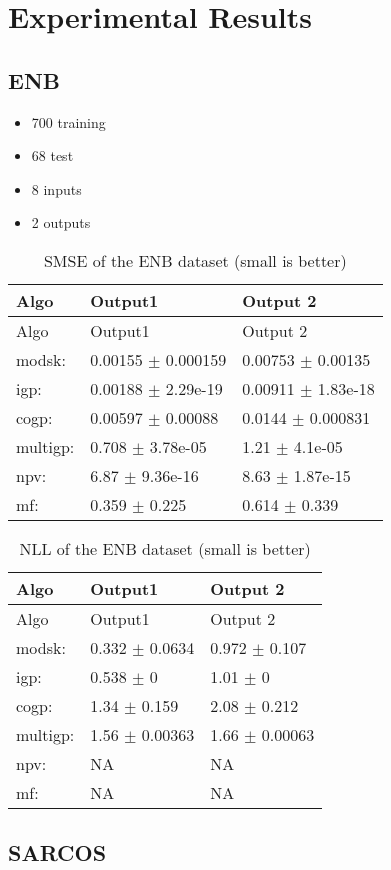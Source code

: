 \section{Experimental Results}\label{sec:report}

\subsection{ENB}\label{sec:enb}

\begin{itemize}
\item
  700 training
\item
  68 test
\item
  8 inputs
\item
  2 outputs
\end{itemize}

\begin{longtable}[]{@{}lll@{}}
\caption{SMSE of the ENB dataset (small is better)}\tabularnewline
\toprule
Algo & Output1 & Output 2\tabularnewline
\midrule
\endfirsthead
\toprule
Algo & Output1 & Output 2\tabularnewline
\midrule
\endhead
modsk: & 0.00155 \(\pm\) 0.000159 & 0.00753 \(\pm\)
0.00135\tabularnewline
igp: & 0.00188 \(\pm\) 2.29e-19 & 0.00911 \(\pm\)
1.83e-18\tabularnewline
cogp: & 0.00597 \(\pm\) 0.00088 & 0.0144 \(\pm\) 0.000831\tabularnewline
multigp: & 0.708 \(\pm\) 3.78e-05 & 1.21 \(\pm\) 4.1e-05\tabularnewline
npv: & 6.87 \(\pm\) 9.36e-16 & 8.63 \(\pm\) 1.87e-15\tabularnewline
mf: & 0.359 \(\pm\) 0.225 & 0.614 \(\pm\) 0.339\tabularnewline
\bottomrule
\end{longtable}

\begin{longtable}[]{@{}lll@{}}
\caption{NLL of the ENB dataset (small is better)}\tabularnewline
\toprule
Algo & Output1 & Output 2\tabularnewline
\midrule
\endfirsthead
\toprule
Algo & Output1 & Output 2\tabularnewline
\midrule
\endhead
modsk: & 0.332 \(\pm\) 0.0634 & 0.972 \(\pm\) 0.107\tabularnewline
igp: & 0.538 \(\pm\) 0 & 1.01 \(\pm\) 0\tabularnewline
cogp: & 1.34 \(\pm\) 0.159 & 2.08 \(\pm\) 0.212\tabularnewline
multigp: & 1.56 \(\pm\) 0.00363 & 1.66 \(\pm\) 0.00063\tabularnewline
npv: & NA & NA\tabularnewline
mf: & NA & NA\tabularnewline
\bottomrule
\end{longtable}

\subsection{SARCOS}\label{sec:sarcos}

